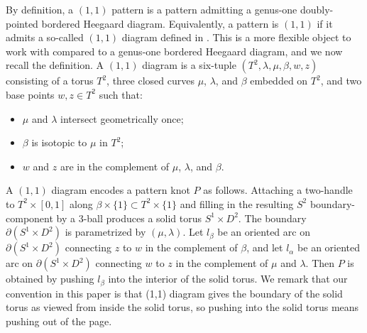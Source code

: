 \documentclass{amsart}
\theoremstyle{definition}
\theoremstyle{remark}
\numberwithin{equation}{section}
\numberwithin{equation}{section} \makeatletter
\begin{document}
By definition, a $(1,1)$ pattern is a pattern admitting a genus-one doubly-pointed bordered Heegaard diagram. Equivalently, a pattern is $(1,1)$ if it admits a so-called $(1,1)$ diagram defined in \cite{Chen2019}. This is a more flexible object to work with compared to a genus-one bordered Heegaard diagram, and we now recall the definition. A $(1,1)$ diagram is a six-tuple $(T^2,\lambda,\mu,\beta,w,z)$
 consisting of a torus $T^2$, three closed curves $\mu$, $\lambda$, and $\beta$ embedded on $T^2$, and two base points $w,z\in T^2$ such that:
 \begin{itemize}
 	\item[(1)] $\mu$ and $\lambda$ intersect geometrically once;
 	\item[(2)] $\beta$ is isotopic to $\mu$ in $T^2$;
 	\item[(3)] $w$ and $z$ are in the complement of $\mu$, $\lambda$, and $\beta$.
 \end{itemize}
A $(1,1)$ diagram encodes a pattern knot $P$ as follows. Attaching a two-handle to $T^2\times[0,1]$ along $\beta\times\{1\}\subset T^2\times \{1\}$ and filling in the resulting $S^2$ boundary-component by a 3-ball produces a solid torus $S^1\times D^2$. The boundary $\partial (S^1\times D^2)$ is parametrized by $(\mu, \lambda)$. Let $l_\beta$ be an oriented arc on $\partial (S^1\times D^2)$ connecting $z$ to $w$ in the complement of $\beta$, and let $l_\alpha$ be an oriented arc on $\partial (S^1\times D^2)$ connecting $w$ to $z$ in the complement of $\mu$ and $\lambda$. Then $P$ is obtained by pushing $l_\beta$ into the interior of the solid torus.  We remark that our convention in this paper is that (1,1) diagram gives the boundary of the solid torus as viewed from inside the solid torus, so pushing into the solid torus means pushing out of the page. 
\end{document}
